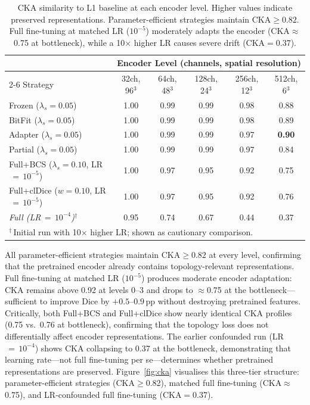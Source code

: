\documentclass[runningheads]{llncs}
\begin{document}
\begin{table}[t]
\caption{CKA similarity to L1 baseline at each encoder level. Higher values indicate preserved representations. Parameter-efficient strategies maintain CKA${\geq}0.82$. Full fine-tuning at matched LR ($10^{-5}$) moderately adapts the encoder (CKA${\approx}$0.75 at bottleneck), while a 10$\times$ higher LR causes severe drift (CKA${=}$0.37).}
\label{tab:cka}
\centering
\small
\begin{tabular}{lccccc}
\toprule
 & \multicolumn{5}{c}{Encoder Level (channels, spatial resolution)} \\
\cmidrule(lr){2-6}
Strategy & 32ch, 96$^3$ & 64ch, 48$^3$ & 128ch, 24$^3$ & 256ch, 12$^3$ & 512ch, 6$^3$ \\
\midrule
Frozen ($\lambda_s{=}0.05$)  & 1.00 & 0.99 & 0.99 & 0.98 & 0.88 \\
BitFit ($\lambda_s{=}0.05$)  & 1.00 & 0.99 & 0.99 & 0.98 & 0.89 \\
Adapter ($\lambda_s{=}0.05$) & 1.00 & 0.99 & 0.99 & 0.97 & \textbf{0.90} \\
Partial ($\lambda_s{=}0.05$) & 1.00 & 0.99 & 0.99 & 0.97 & 0.84 \\
\midrule
Full+BCS ($\lambda_s{=}0.10$, LR$\,{=}\,10^{-5}$)    & 1.00 & 0.97 & 0.95 & 0.92 & 0.75 \\
Full+clDice ($w{=}0.10$, LR$\,{=}\,10^{-5}$)          & 1.00 & 0.97 & 0.95 & 0.92 & 0.76 \\
\rowcolor{gray!15}
\textit{Full (LR$\,{=}\,10^{-4}$)$^\dagger$}            & 0.95 & 0.74 & 0.67 & 0.44 & 0.37 \\
\bottomrule
\multicolumn{6}{l}{\footnotesize $^\dagger$\,Initial run with 10$\times$ higher LR; shown as cautionary comparison.} \\
\end{tabular}
\end{table}

All parameter-efficient strategies maintain CKA${\geq}0.82$ at every level, confirming that the pretrained encoder already contains topology-relevant representations.
Full fine-tuning at matched LR ($10^{-5}$) produces moderate encoder adaptation: CKA remains above 0.92 at levels 0--3 and drops to ${\approx}$0.75 at the bottleneck---sufficient to improve Dice by $+0.5$--$0.9$\,pp without destroying pretrained features.
Critically, both Full+BCS and Full+clDice show nearly identical CKA profiles (0.75 vs.\ 0.76 at bottleneck), confirming that the topology loss does not differentially affect encoder representations.
The earlier confounded run (LR$\,{=}\,10^{-4}$) shows CKA collapsing to 0.37 at the bottleneck, demonstrating that learning rate---not full fine-tuning per se---determines whether pretrained representations are preserved.
Figure~\ref{fig:cka} visualises this three-tier structure: parameter-efficient strategies (CKA${\geq}$0.82), matched full fine-tuning (CKA${\approx}$0.75), and LR-confounded full fine-tuning (CKA${=}$0.37).
\end{document}
